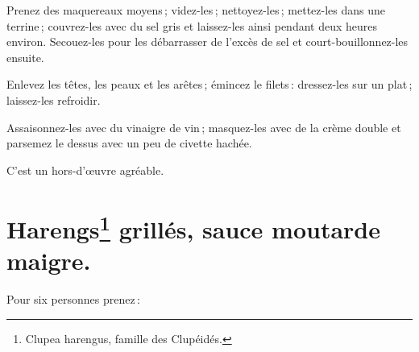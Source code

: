 Prenez des maquereaux moyens ; videz-les ; nettoyez-les ; mettez-les dans une
terrine ; couvrez-les avec du sel gris et laissez-les ainsi pendant deux heures
environ. Secouez-les pour les débarrasser de l'excès de sel et
court-bouillonnez-les ensuite.

Enlevez les têtes, les peaux et les arêtes ; émincez le filets : dressez-les
sur un plat ; laissez-les refroidir.

Assaisonnez-les avec du vinaigre de vin ; masquez-les avec de la crème double
et parsemez le dessus avec un peu de civette hachée.

C'est un hors-d'œuvre agréable.

\section*{\centering Harengs\footnote{Clupea harengus, famille des Clupéidés.}
                     grillés, sauce moutarde maigre.}


Pour six personnes prenez :

\medskip

